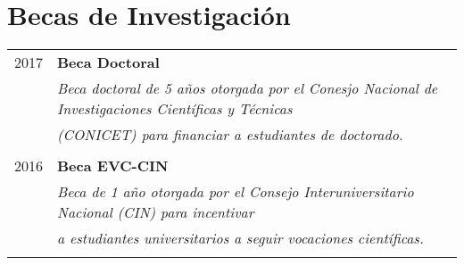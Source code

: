 \documentclass[a4paper,10pt]{article} %
\begin{document}
\section{Becas de Investigación}
\begin{longtable}{rl}

\textsc{2017} & \textbf{Beca Doctoral} \\ 
& \textit{Beca doctoral de 5 años otorgada por el Conesjo Nacional de Investigaciones Científicas y Técnicas} \\
& \textit{(CONICET) para financiar a estudiantes de doctorado.} \\ & \\

\textsc{2016} & \textbf{Beca EVC-CIN} \\ 
& \textit{Beca de 1 año otorgada por el Consejo Interuniversitario Nacional (CIN) para incentivar} \\
& \textit{a estudiantes universitarios a seguir vocaciones científicas.} \\ & \\

\end{longtable}
\end{document}
